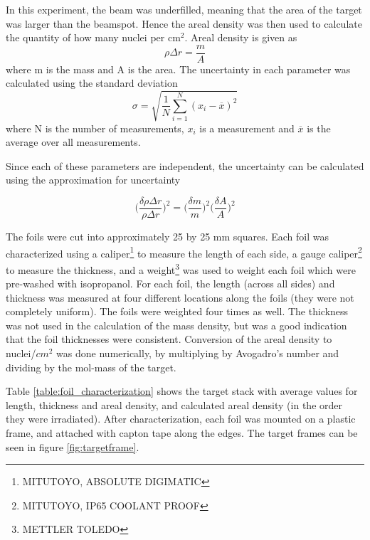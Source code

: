 \noindent
In this experiment, the beam was underfilled, meaning that the area of the target was larger than the beamspot. Hence the areal density was then used to calculate the quantity of how many nuclei per cm$^2$. Areal density is given as 
\begin{equation}
    \rho \Delta r = \frac{m}{A}
\end{equation}
\noindent
where m is the mass and A is the area. The uncertainty in each parameter was calculated using the standard deviation 
\begin{equation}
    \sigma = \sqrt{\frac{1}{N}\sum_{i=1}^N (x_i - \overline{x})^2}
\end{equation}
\noindent
where N is the number of measurements, $x_i$ is a measurement and $\overline{x}$ is the average over all measurements. 

\noindent
Since each of these parameters are independent, the uncertainty can be calculated using the approximation for uncertainty 

\begin{equation}
    \Big(\frac{\delta \rho \Delta r}{\rho \Delta r}\Big)^2= \Big(\frac{\delta m}{m}\Big)^2 \Big(\frac{\delta A}{A}\Big)^2
\end{equation}

\noindent 
The foils were cut into approximately 25 by 25 mm squares. Each foil was characterized using a caliper\footnote{MITUTOYO, ABSOLUTE DIGIMATIC} to measure the length of each side, a gauge caliper\footnote{MITUTOYO, IP65 COOLANT PROOF} to measure the thickness, and a weight\footnote{METTLER TOLEDO} was used to weight each foil which were pre-washed with isopropanol. For each foil, the length (across all sides) and thickness was measured at four different locations along the foils (they were not completely uniform). The foils were weighted four times as well. The thickness was not used in the calculation of the mass density, but was a good indication that the foil thicknesses were consistent. Conversion of the areal density to nuclei/$cm^2$ was done numerically, by multiplying by Avogadro's number and dividing by the mol-mass of the target.

\noindent
Table \ref{table:foil_characterization} shows the target stack with average values for length, thickness and areal density, and calculated areal density (in the order they were irradiated). After characterization, each foil was mounted on a plastic frame, and attached with capton tape along the edges. The target frames can be seen in figure \ref{fig:targetframe}. 



